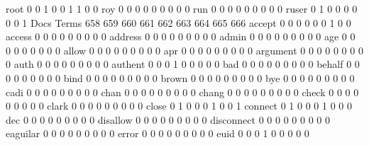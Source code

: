 \documentclass[compress,8pt]{beamer}
\begin{document}
\begin{frame}
\begin{Schunk}
  root                                       0   0   1   0   0   1   1   0   0
  roy                                        0   0   0   0   0   0   0   0   0
  run                                        0   0   0   0   0   0   0   0   0
  ruser                                      0   1   0   0   0   0   0   0   1
                                          Docs
Terms                                      658 659 660 661 662 663 664 665 666
  accept                                     0   0   0   0   0   0   1   0   0
  access                                     0   0   0   0   0   0   0   0   0
  address                                    0   0   0   0   0   0   0   0   0
  admin                                      0   0   0   0   0   0   0   0   0
  age                                        0   0   0   0   0   0   0   0   0
  allow                                      0   0   0   0   0   0   0   0   0
  apr                                        0   0   0   0   0   0   0   0   0
  argument                                   0   0   0   0   0   0   0   0   0
  auth                                       0   0   0   0   0   0   0   0   0
  authent                                    0   0   0   1   0   0   0   0   0
  bad                                        0   0   0   0   0   0   0   0   0
  behalf                                     0   0   0   0   0   0   0   0   0
  bind                                       0   0   0   0   0   0   0   0   0
  brown                                      0   0   0   0   0   0   0   0   0
  bye                                        0   0   0   0   0   0   0   0   0
  cadi                                       0   0   0   0   0   0   0   0   0
  chan                                       0   0   0   0   0   0   0   0   0
  chang                                      0   0   0   0   0   0   0   0   0
  check                                      0   0   0   0   0   0   0   0   0
  clark                                      0   0   0   0   0   0   0   0   0
  close                                      0   1   0   0   0   1   0   0   1
  connect                                    0   1   0   0   0   1   0   0   0
  dec                                        0   0   0   0   0   0   0   0   0
  disallow                                   0   0   0   0   0   0   0   0   0
  disconnect                                 0   0   0   0   0   0   0   0   0
  eaguilar                                   0   0   0   0   0   0   0   0   0
  error                                      0   0   0   0   0   0   0   0   0
  euid                                       0   0   0   1   0   0   0   0   0

\end{Schunk}
\end{frame}
\end{document}
